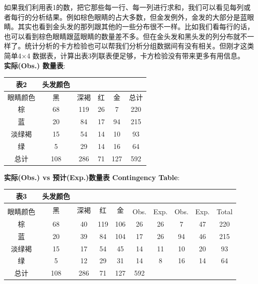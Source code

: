 如果我们利用表1的数，把它那些每一行、每一列进行求和，我们可以看见每列或者每行的分析结果。例如棕色眼睛的占大多数，但金发例外，金发的大部分是蓝眼睛。其实也看到金头发的那列跟其他的一些分布很不一样。比如我们看每行的话，也可以看到棕色眼睛跟蓝眼睛的数量差不多。但在金头发和黑头发的列分布就不一样了。统计分析的卡方检验也可以帮我们分析分组数据间有没有相关。但刚才这类简单4×4 数据表，计算出表3列联表便足够，卡方检验没有带来更多有用信息。\\
\textbf{实际(Obs.) 数量表}:


\begin{tabular}{|c|c|c|c|c|c|}
\hline
表2&\multirow{5}{*}{头发颜色 }\\
\hline
眼睛颜色&黑&深褐&红&金&总计\\
\hline
棕&68&119&26&7&220\\
\hline
蓝&20&84&17&94&215\\
\hline
淡绿褐&15&54&14&10&93\\
\hline
绿&5&29&14&16&64\\
\hline
总计&108&286&71&127&592\\
\hline
\end{tabular}


\textbf{实际(Obs.) vs 预计(Exp.)数量表 Contingency Table}:


\begin{tabular}{|c|c|c|c|c|c|c|c|c|c|}
\hline
表3&\multirow{8}{*}{头发颜色 }&\:\\
\hline
\:&\multirow{2}{*}{黑}&\multirow{2}{*}{深褐}&\multirow{2}{*}{红}&\multirow{2}{*}{金}&\:\\
\hline
眼睛颜色&Obs.&Exp.&Obs.&Exp.&Obs.&Exp.&Obs.&Exp.&Total\\
\hline
棕&68&40&119&106&26&26&7&47&220\\
\hline
蓝&20&39&84&104&17&26&94&46&215\\
\hline
淡绿褐&15&17&54&45&14&11&10&20&93\\
\hline
绿&5&12&29&31&14&8&16&14&64\\
\hline
总计&\multirow{2}{*}{108}&\multirow{2}{*}{286}&\multirow{2}{*}{71}&\multirow{2}{*}{127}&592\\
\hline
\end{tabular}

\begin{description}
\item[]
\end{description}

